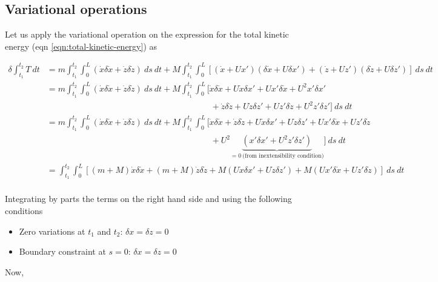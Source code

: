 \subsection{Variational operations}
Let us apply the variational operation on the expression for the total kinetic energy (eqn \ref{eqn:total-kinetic-energy}) as

\begin{align*}
   \delta \int_{t_1}^{t_2} T~dt & = m \int_{t_1}^{t_2} \int_0^L (\dot{x}\delta \dot{x} + \dot{z}\delta \dot{z})~ds~dt + M \int_{t_1}^{t_2} \int_0^L [(\dot{x} + Ux')(\delta \dot{x} + U\delta x') + (\dot{z} + Uz')(\delta \dot{z} + U\delta z')]~ds~dt \\
     &= m \int_{t_1}^{t_2} \int_0^L (\dot{x}\delta \dot{x} + \dot{z}\delta \dot{z})~ds~dt + M \int_{t_1}^{t_2} \int_0^L [\dot{x}\delta \dot{x} + U \dot{x}\delta x' + Ux'\delta \dot{x} +U^2x'\delta x'  \\ 
     &\phantom{=} \qquad\qquad\qquad\qquad\qquad\qquad\qquad\qquad\qquad + \dot{z}\delta \dot{z} + U \dot{z}\delta z' + Uz'\delta \dot{z} +U^2z'\delta z']~ds~dt  \\
     &= m \int_{t_1}^{t_2} \int_0^L (\dot{x}\delta \dot{x} + \dot{z}\delta \dot{z})~ds~dt + M \int_{t_1}^{t_2} \int_0^L [\dot{x}\delta \dot{x}+ \dot{z}\delta \dot{z} + U \dot{x}\delta x' + U \dot{z}\delta z' + Ux'\delta \dot{x} + Uz'\delta \dot{z} \\
     &\phantom{=} \qquad\qquad\qquad\qquad\qquad\qquad\qquad\qquad\qquad + U^2 \underbrace{(x'\delta x' + U^2z'\delta z')}_{=0~\text{(from inextensibility condition)}}]~ds~dt  \\
     &= \int_{t_1}^{t_2} \int_0^L[(m + M) \dot{x}\delta \dot{x} + (m + M) \dot{z}\delta \dot{z} + M (U \dot{x}\delta x' + U \dot{z}\delta z') + M (Ux'\delta \dot{x} + Uz'\delta \dot{z})]~ds~dt\\
\end{align*}

Integrating by parts the terms on the right hand side and using the following conditions
\begin{itemize}
	\item Zero variations at $t_1$ and $t_2$: $\delta x = \delta z = 0$
	\item Boundary constraint at $s= 0$: $\delta x= \delta z = 0$
\end{itemize} 

Now, 

